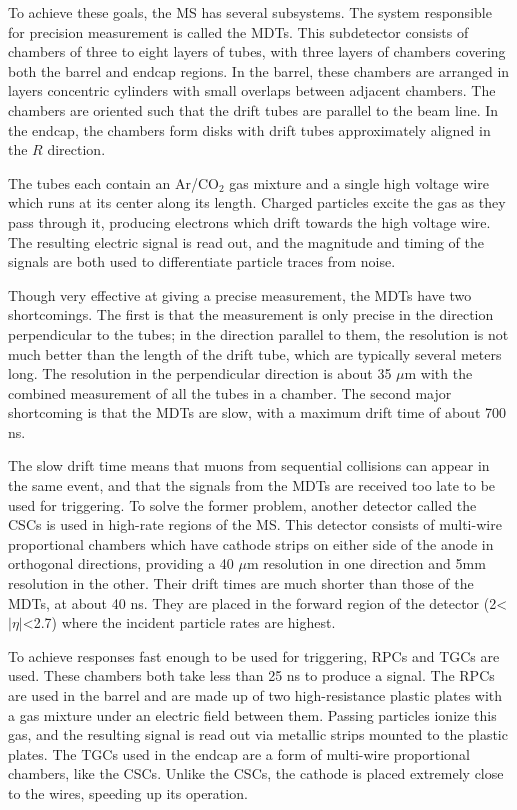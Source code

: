 To achieve these goals, the \ac{MS} has several subsystems. The system responsible for precision measurement is called the \acfp{MDT}. This subdetector consists of chambers of three to eight layers of tubes, with three layers of chambers covering both the barrel and endcap regions. In the barrel, these chambers are arranged in layers concentric cylinders with small overlaps between adjacent chambers. The chambers are oriented such that the drift tubes are parallel to the beam line. In the endcap, the chambers form disks with drift tubes approximately aligned in the $R$ direction. 

The tubes each contain an Ar/CO$_2$ gas mixture and a single high voltage wire which runs at its center along its length. Charged particles excite the gas as they pass through it, producing electrons which drift towards the high voltage wire. The resulting electric signal is read out, and the magnitude and timing of the signals are both used to differentiate particle traces from noise. 

Though very effective at giving a precise measurement, the \acp{MDT} have two shortcomings. The first is that the measurement is only precise in the direction perpendicular to the tubes; in the direction parallel to them, the resolution is not much better than the length of the drift tube, which are typically several meters long. The resolution in the perpendicular direction is about 35 $\mu$m with the combined measurement of all the tubes in a chamber. The second major shortcoming is that the \acp{MDT} are slow, with a maximum drift time of about 700 ns. 

The slow drift time means that muons from sequential collisions can appear in the same event, and that the signals from the \acp{MDT} are received too late to be used for triggering. To solve the former problem, another detector called the \acp{CSC} is used in high-rate regions of the \ac{MS}. This detector consists of multi-wire proportional chambers which have cathode strips on either side of the anode in orthogonal directions, providing a 40 $\mu$m resolution in one direction and 5mm resolution in the other. Their drift times are much shorter than those of the \acp{MDT}, at about 40 ns. They are placed in the forward region of the detector (2<$|\eta|$<2.7) where the incident particle rates are highest. 

To achieve responses fast enough to be used for triggering, \acp{RPC} and \acp{TGC} are used. These chambers both take less than 25 ns to produce a signal. The \acp{RPC} are used in the barrel and are made up of two high-resistance plastic plates with a gas mixture under an electric field between them. Passing particles ionize this gas, and the resulting signal is read out via metallic strips mounted to the plastic plates. The \acp{TGC} used in the endcap are a form of multi-wire proportional chambers, like the \acp{CSC}. Unlike the \acp{CSC}, the cathode is placed extremely close to the wires, speeding up its operation. 

